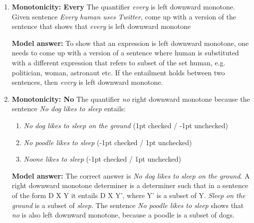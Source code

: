 \documentclass[a4,11pt]{article}
\begin{document}
\begin{enumerate}[leftmargin = 12pt]
        \begin{enumerate}[noitemsep]
        \item A $\cap$ B = $\emptyset$ (1pt checked / -1pt unchecked)
	\item A $\cup$ B = $\emptyset$  (-1pt checked / 1pt unchecked)
        \item A $\subset$ B (-1pt checked / 1pt unchecked)
	\end{enumerate}	

{\bf Model answer:}  The correct answer is  A $\subset$ B. Since every member of the set of parrots is a member of the set of entities who like singing.

\item {\bf Monotonicity: Every} The quantifier \textit{every} is left downward monotone. Given sentence \textit{Every human uses Twitter}, come up with a version of the sentence that shows that  \textit{every} is left downward monotone
	
{\bf Model answer:} To show that an expression is left downward monotone, one needs to come up with a version of a sentence where human is substituted with a different expression that refers to subset of the set human, e.g. politician, woman, astronaut etc. If the entailment holds between two sentences, then  \textit{every} is left downward monotone.


\item {\bf Monotonicity: No} The quantifier \textit{no} right downward monotone because the sentence \textit{No dog likes to sleep} entails:

      \begin{enumerate}[noitemsep]
        \item \textit{No dog likes to sleep on the ground} (1pt checked / -1pt unchecked)
	\item \textit{No poodle likes to sleep} (-1pt checked / 1pt unchecked)
        \item \textit{Noone likes to sleep} (-1pt checked / 1pt unchecked)
	\end{enumerate}	

{\bf Model answer:}  The correct answer is \textit{No dog likes to sleep on the ground}. A right downward monotone determiner is a determiner such that in a sentence of the form D X Y it entails D X Y', where Y' is a subset of Y. \textit{Sleep on the ground} is a subset of \textit{sleep}. The sentence \textit{No poodle likes to sleep} shows that \textit{no} is also left downward monotone, because a poodle is a subset of dogs.


\end{enumerate}
\end{document}

